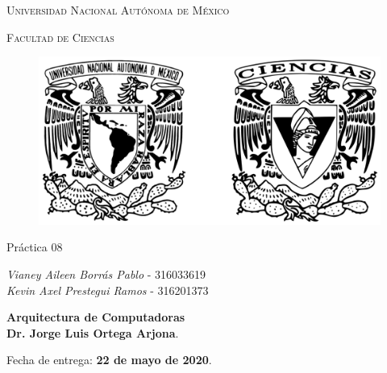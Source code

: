 \documentclass[10pt,letterpaper]{article}
\begin{document}
	
	\begin{titlepage}
		\centering
		
		{\scshape\LARGE Universidad Nacional Autónoma de México \par}
		
		\vspace{1cm}
		{\scshape\Large Facultad de Ciencias\par}
		\vspace{1.5cm}
		
		\begin{figure}[h]
			\centering
			\includegraphics[scale=0.15]{logo.png}
		\end{figure}
		
		\vspace{.8 cm}
		
		{\LARGE Práctica 08 \par}
		
		\vspace{0.5cm}
		\large{\itshape{Vianey Aileen Borrás Pablo}} \small{ - 316033619} \\ \vspace{0.3cm}
		\large{\itshape{Kevin Axel Prestegui Ramos}} \small{ - 316201373} \\ \vspace{0.3cm}
		\vfill
		
		\textbf{Arquitectura de Computadoras}\\
		\textbf{Dr. Jorge Luis Ortega Arjona}. \par
		\vspace{0.5cm}
		Fecha de entrega: \textbf{22 de mayo de 2020}.
	\end{titlepage}
\end{document}

